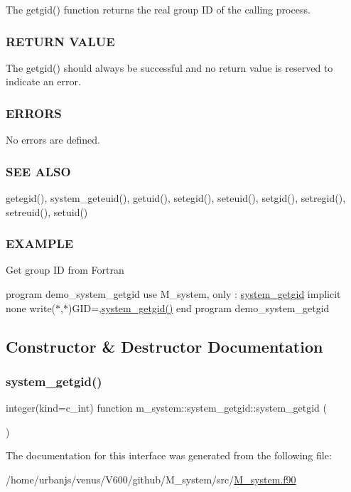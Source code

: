 The getgid() function returns the real group ID of the calling process.

\subsubsection*{R\+E\+T\+U\+RN V\+A\+L\+UE}

The getgid() should always be successful and no return value is reserved to indicate an error.

\subsubsection*{E\+R\+R\+O\+RS}

No errors are defined.

\subsubsection*{S\+EE A\+L\+SO}

getegid(), system\+\_\+geteuid(), getuid(), setegid(), seteuid(), setgid(), setregid(), setreuid(), setuid()

\subsubsection*{E\+X\+A\+M\+P\+LE}

Get group ID from Fortran

program demo\+\_\+system\+\_\+getgid use M\+\_\+system, only \+: \mbox{\hyperlink{interfacem__system_1_1system__getgid}{system\+\_\+getgid}} implicit none write($\ast$,$\ast$)\textquotesingle{}G\+ID=\textquotesingle{},\mbox{\hyperlink{interfacem__system_1_1system__getgid_aa1f2ceda993e2f36bf0cdc9cf28ea1d3}{system\+\_\+getgid()}} end program demo\+\_\+system\+\_\+getgid 

\subsection{Constructor \& Destructor Documentation}
\mbox{\label{interfacem__system_1_1system__getgid_aa1f2ceda993e2f36bf0cdc9cf28ea1d3}} 
\subsubsection{\texorpdfstring{system\+\_\+getgid()}{system\_getgid()}}
{\footnotesize\ttfamily integer(kind=c\+\_\+int) function m\+\_\+system\+::system\+\_\+getgid\+::system\+\_\+getgid (\begin{DoxyParamCaption}{ }\end{DoxyParamCaption})\hspace{0.3cm}{\ttfamily [private]}}



The documentation for this interface was generated from the following file\+:\begin{DoxyCompactItemize}
\item 
/home/urbanjs/venus/\+V600/github/\+M\+\_\+system/src/\mbox{\hyperlink{M__system_8f90}{M\+\_\+system.\+f90}}\end{DoxyCompactItemize}
